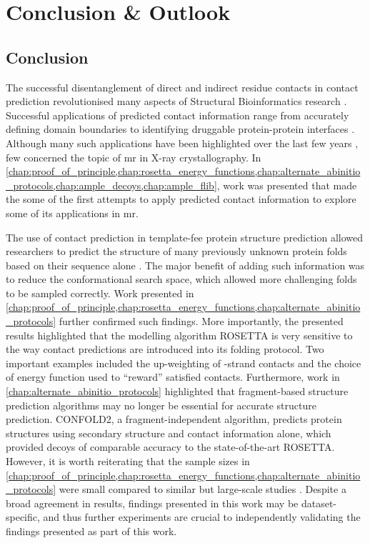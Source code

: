 \chapter{Conclusion \& Outlook}
\clearpage

\section{Conclusion}
The successful disentanglement of direct and indirect residue contacts in contact prediction revolutionised many aspects of Structural Bioinformatics research \cite{Simkovic2017-xs}. Successful applications of predicted contact information range from accurately defining domain boundaries \cite{Sadowski2013-zu} to identifying druggable protein-protein interfaces \cite{Bai2016-sw}. Although many such applications have been highlighted over the last few years \cite{Simkovic2017-xs}, few concerned the topic of \gls{mr} in X-ray crystallography. In \cref{chap:proof_of_principle,chap:rosetta_energy_functions,chap:alternate_abinitio_protocols,chap:ample_decoys,chap:ample_flib}, work was presented that made the some of the first attempts to apply predicted contact information to explore some of its applications in \gls{mr}.

The use of contact prediction in template-fee protein structure prediction allowed researchers to predict the structure of many previously unknown protein folds based on their sequence alone \cite[e.g.,][]{Marks2011-os,Michel2014-eg,Kosciolek2014-bt,Ovchinnikov2015-tn,Ovchinnikov2016-jj,Michel2017-xh,De_Oliveira2018-sg,Ovchinnikov2017-nd,Wang2017-rx}. The major benefit of adding such information was to reduce the conformational search space, which allowed more challenging folds to be sampled correctly. Work presented in \cref{chap:proof_of_principle,chap:rosetta_energy_functions,chap:alternate_abinitio_protocols} further confirmed such findings. More importantly, the presented results highlighted that the modelling algorithm ROSETTA is very sensitive to the way contact predictions are introduced into its folding protocol. Two important examples included the up-weighting of \textbeta-strand contacts and the choice of energy function used to ``reward'' satisfied contacts. Furthermore, work in \cref{chap:alternate_abinitio_protocols} highlighted that fragment-based structure prediction algorithms may no longer be essential for accurate structure prediction. CONFOLD2, a fragment-independent algorithm, predicts protein structures using secondary structure and contact information alone, which provided decoys of comparable accuracy to the state-of-the-art ROSETTA. However, it is worth reiterating that the sample sizes in \cref{chap:proof_of_principle,chap:rosetta_energy_functions,chap:alternate_abinitio_protocols} were small compared to similar but large-scale studies \cite[e.g.][]{Michel2017-xh,De_Oliveira2016-gj,Ovchinnikov2015-tn,Wang2017-rx}. Despite a broad agreement in results, findings presented in this work may be dataset-specific, and thus further experiments are crucial to independently validating the findings presented as part of this work.

